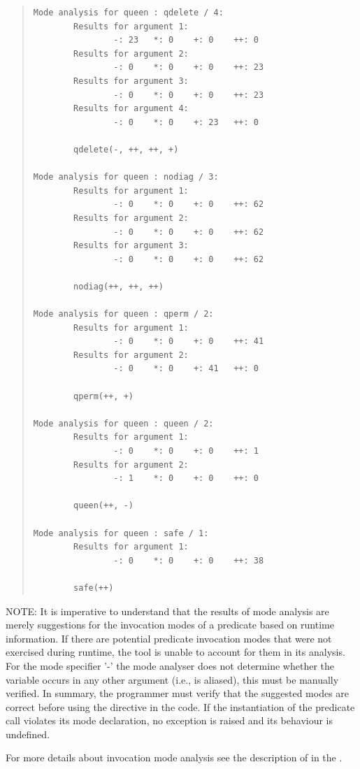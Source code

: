 \begin{quote}
\begin{verbatim}
Mode analysis for queen : qdelete / 4:
        Results for argument 1:
                -: 23   *: 0    +: 0    ++: 0
        Results for argument 2:
                -: 0    *: 0    +: 0    ++: 23
        Results for argument 3:
                -: 0    *: 0    +: 0    ++: 23
        Results for argument 4:
                -: 0    *: 0    +: 23   ++: 0

        qdelete(-, ++, ++, +)

Mode analysis for queen : nodiag / 3:
        Results for argument 1:
                -: 0    *: 0    +: 0    ++: 62
        Results for argument 2:
                -: 0    *: 0    +: 0    ++: 62
        Results for argument 3:
                -: 0    *: 0    +: 0    ++: 62

        nodiag(++, ++, ++)

Mode analysis for queen : qperm / 2:
        Results for argument 1:
                -: 0    *: 0    +: 0    ++: 41
        Results for argument 2:
                -: 0    *: 0    +: 41   ++: 0

        qperm(++, +)

Mode analysis for queen : queen / 2:
        Results for argument 1:
                -: 0    *: 0    +: 0    ++: 1
        Results for argument 2:
                -: 1    *: 0    +: 0    ++: 0

        queen(++, -)

Mode analysis for queen : safe / 1:
        Results for argument 1:
                -: 0    *: 0    +: 0    ++: 38

        safe(++)
\end{verbatim}
\end{quote}

NOTE: It is imperative to understand that the results of mode analysis
are merely suggestions for the invocation modes of a predicate based on
runtime information. If there are potential predicate invocation modes
that were not exercised during runtime, the tool is unable to account
for them in its analysis. For the mode specifier '-' the mode analyser
does not determine whether the variable occurs in any other argument
(i.e., is aliased), this must be manually verified.
In summary, the programmer must verify that the suggested modes are correct
before using the directive in the code.  If the instantiation of the
predicate call violates its mode declaration, no exception is raised and
its behaviour is undefined.

For more details about invocation mode analysis see
the description of
%
in the .

